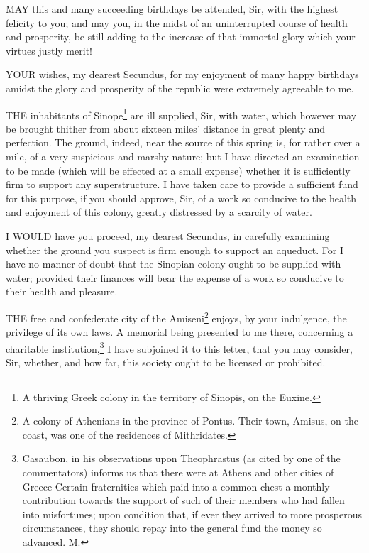 
MAY this and many succeeding birthdays be attended, Sir, with the highest
felicity to you; and may you, in the midst of an uninterrupted course of
health and prosperity, be still adding to the increase of that immortal
glory which your virtues justly merit!


YOUR wishes, my dearest Secundus, for my enjoyment of many happy birthdays
amidst the glory and prosperity of the republic were extremely agreeable
to me.


THE inhabitants of Sinope\footnote{A thriving Greek
colony in the territory of Sinopis, on the Euxine.} are ill supplied, Sir, with water, which
however may be brought thither from about sixteen miles' distance in great
plenty and perfection. The ground, indeed, near the source of this spring
is, for rather over a mile, of a very suspicious and marshy nature; but I
have directed an examination to be made (which will be effected at a small
expense) whether it is sufficiently firm to support any superstructure. I
have taken care to provide a sufficient fund for this purpose, if you
should approve, Sir, of a work so conducive to the health and enjoyment of
this colony, greatly distressed by a scarcity of water.


I WOULD have you proceed, my dearest Secundus, in carefully examining
whether the ground you suspect is firm enough to support an aqueduct. For
I have no manner of doubt that the Sinopian colony ought to be supplied
with water; provided their finances will bear the expense of a work so
conducive to their health and pleasure.


THE free and confederate city of the Amiseni\footnote{A colony of Athenians
in the province of Pontus. Their town, Amisus, on the coast, was one of
the residences of Mithridates.} enjoys, by your
indulgence, the privilege of its own laws. A memorial being presented to
me there, concerning a charitable institution,\footnote{Casaubon, in his
observations upon Theophrastus (as cited by one of the commentators)
informs us that there were at Athens and other cities of Greece Certain
fraternities which paid into a common chest a monthly contribution towards
the support of such of their members who had fallen into misfortunes; upon
condition that, if ever they arrived to more prosperous circumstances,
they should repay into the general fund the money so advanced. M.} I have subjoined
it to this letter, that you may consider, Sir, whether, and how far, this
society ought to be licensed or prohibited.


